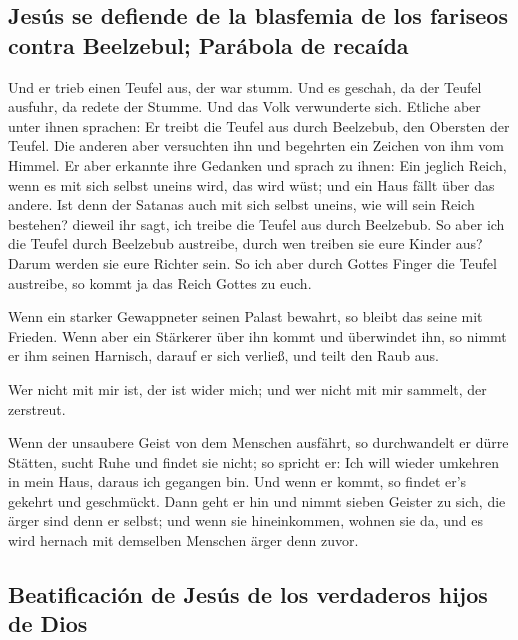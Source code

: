 \hypertarget{jesuxfas-se-defiende-de-la-blasfemia-de-los-fariseos-contra-beelzebul-paruxe1bola-de-recauxedda}{%
\subsection{Jesús se defiende de la blasfemia de los fariseos contra
Beelzebul; Parábola de
recaída}\label{jesuxfas-se-defiende-de-la-blasfemia-de-los-fariseos-contra-beelzebul-paruxe1bola-de-recauxedda}}

 Und er trieb einen Teufel aus, der war stumm. Und es
geschah, da der Teufel ausfuhr, da redete der Stumme. Und das Volk
verwunderte sich.  Etliche aber unter ihnen sprachen: Er
treibt die Teufel aus durch Beelzebub, den Obersten der Teufel.
 Die anderen aber versuchten ihn und begehrten ein
Zeichen von ihm vom Himmel.  Er aber erkannte ihre
Gedanken und sprach zu ihnen: Ein jeglich Reich, wenn es mit sich selbst
uneins wird, das wird wüst; und ein Haus fällt über das andere.
 Ist denn der Satanas auch mit sich selbst uneins, wie
will sein Reich bestehen? dieweil ihr sagt, ich treibe die Teufel aus
durch Beelzebub.  So aber ich die Teufel durch Beelzebub
austreibe, durch wen treiben sie eure Kinder aus? Darum werden sie eure
Richter sein.  So ich aber durch Gottes Finger die Teufel
austreibe, so kommt ja das Reich Gottes zu euch.

 Wenn ein starker Gewappneter seinen Palast bewahrt, so
bleibt das seine mit Frieden.  Wenn aber ein Stärkerer
über ihn kommt und überwindet ihn, so nimmt er ihm seinen Harnisch,
darauf er sich verließ, und teilt den Raub aus.

 Wer nicht mit mir ist, der ist wider mich; und wer nicht
mit mir sammelt, der zerstreut.

 Wenn der unsaubere Geist von dem Menschen ausfährt, so
durchwandelt er dürre Stätten, sucht Ruhe und findet sie nicht; so
spricht er: Ich will wieder umkehren in mein Haus, daraus ich gegangen
bin.  Und wenn er kommt, so findet er's gekehrt und
geschmückt.  Dann geht er hin und nimmt sieben Geister zu
sich, die ärger sind denn er selbst; und wenn sie hineinkommen, wohnen
sie da, und es wird hernach mit demselben Menschen ärger denn zuvor.

\hypertarget{beatificaciuxf3n-de-jesuxfas-de-los-verdaderos-hijos-de-dios}{%
\subsection{Beatificación de Jesús de los verdaderos hijos de
Dios}\label{beatificaciuxf3n-de-jesuxfas-de-los-verdaderos-hijos-de-dios}}

